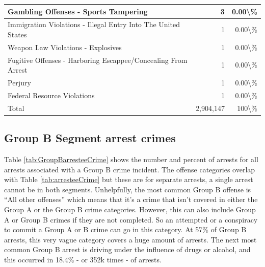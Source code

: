 \documentclass[
]{krantz}
\begin{document}
\begin{longtable}[t]{l|r|r}
\hline
Gambling Offenses - Sports Tampering & 3 & 0.00\textbackslash{}\%\\
\hline
Immigration Violations - Illegal Entry Into The United States & 1 & 0.00\textbackslash{}\%\\
\hline
Weapon Law Violations - Explosives & 1 & 0.00\textbackslash{}\%\\
\hline
Fugitive Offenses - Harboring Escappee/Concealing From Arrest & 1 & 0.00\textbackslash{}\%\\
\hline
Perjury & 1 & 0.00\textbackslash{}\%\\
\hline
Federal Resource Violations & 1 & 0.00\textbackslash{}\%\\
\hline
Total & 2,904,147 & 100\textbackslash{}\%\\
\hline
\end{longtable}

\subsection{Group B Segment arrest
crimes}\label{group-b-segment-arrest-crimes}

Table \ref{tab:GroupBarresteeCrime} shows the number and
percent of arrests for all arrests associated with a Group B
crime incident. The offense categories overlap with Table
\ref{tab:arresteeCrime} but these are for separate arrests,
a single arrest cannot be in both segments. Unhelpfully, the
most common Group B offense is ``All other offenses'' which
means that it's a crime that isn't covered in either the
Group A or the Group B crime categories. However, this can
also include Group A or Group B crimes if they are not
completed. So an attempted or a conspiracy to commit a Group
A or B crime can go in this category. At 57\% of Group B
arrests, this very vague category covers a huge amount of
arrests. The next most common Group B arrest is driving
under the influence of drugs or alcohol, and this occurred
in 18.4\% - or 352k times - of arrests.
\end{document}
